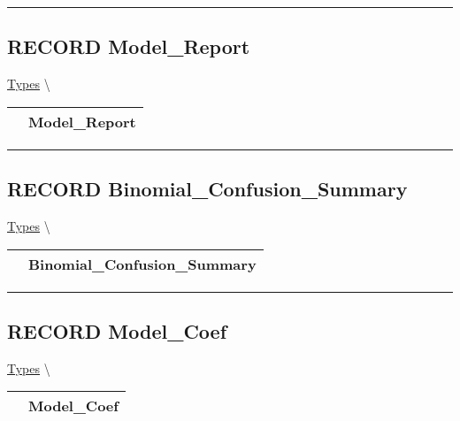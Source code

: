 \par


\rule{\linewidth}{0.5pt}
\subsection*{\textsf{\colorbox{headtoc}{\color{white} RECORD}
Model\_Report}}

\hypertarget{ecldoc:types.model_report}{}
\hspace{0pt} \hyperlink{ecldoc:Types}{Types} \textbackslash 

{\renewcommand{\arraystretch}{1.5}
\begin{tabularx}{\textwidth}{|>{\raggedright\arraybackslash}l|X|}
\hline
\hspace{0pt}\mytexttt{\color{red} } & \textbf{Model\_Report} \\
\hline
\end{tabularx}
}

\par


\rule{\linewidth}{0.5pt}
\subsection*{\textsf{\colorbox{headtoc}{\color{white} RECORD}
Binomial\_Confusion\_Summary}}

\hypertarget{ecldoc:types.binomial_confusion_summary}{}
\hspace{0pt} \hyperlink{ecldoc:Types}{Types} \textbackslash 

{\renewcommand{\arraystretch}{1.5}
\begin{tabularx}{\textwidth}{|>{\raggedright\arraybackslash}l|X|}
\hline
\hspace{0pt}\mytexttt{\color{red} } & \textbf{Binomial\_Confusion\_Summary} \\
\hline
\end{tabularx}
}

\par


\rule{\linewidth}{0.5pt}
\subsection*{\textsf{\colorbox{headtoc}{\color{white} RECORD}
Model\_Coef}}

\hypertarget{ecldoc:types.model_coef}{}
\hspace{0pt} \hyperlink{ecldoc:Types}{Types} \textbackslash 

{\renewcommand{\arraystretch}{1.5}
\begin{tabularx}{\textwidth}{|>{\raggedright\arraybackslash}l|X|}
\hline
\hspace{0pt}\mytexttt{\color{red} } & \textbf{Model\_Coef} \\
\hline
\end{tabularx}
}

